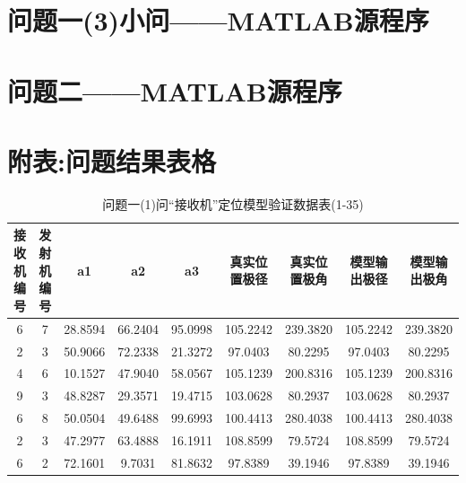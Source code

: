 \documentclass[withoutpreface,bwprint]{cumcmthesis} %
\begin{document}
\begin{appendices}
    	\section{问题一(3)小问——MATLAB源程序}
			
	     \section{问题二——MATLAB源程序}	
		\section{附表:问题结果表格}
					
					\begin{table}[htbp!]
						\caption{问题一(1)问“接收机”定位模型验证数据表(1-35)}
						\footnotesize
							\centering
							\begin{tabular}{@{}ccccccccc@{}}
								\toprule
								\textbf{接收机编号} & \textbf{发射机编号} & \textbf{a1} & \textbf{a2} & \textbf{a3} & \textbf{真实位置极径} & \textbf{真实位置极角} & \textbf{模型输出极径} & \textbf{模型输出极角} \\ \midrule
								6              & 7              & 28.8594     & 66.2404     & 95.0998     & 105.2242        & 239.3820        & 105.2242        & 239.3820        \\
								2              & 3              & 50.9066     & 72.2338     & 21.3272     & 97.0403         & 80.2295         & 97.0403         & 80.2295         \\
								4              & 6              & 10.1527     & 47.9040     & 58.0567     & 105.1239        & 200.8316        & 105.1239        & 200.8316        \\
								9              & 3              & 48.8287     & 29.3571     & 19.4715     & 103.0628        & 80.2937         & 103.0628        & 80.2937         \\
								6              & 8              & 50.0504     & 49.6488     & 99.6993     & 100.4413        & 280.4038        & 100.4413        & 280.4038        \\
								2              & 3              & 47.2977     & 63.4888     & 16.1911     & 108.8599        & 79.5724         & 108.8599        & 79.5724         \\
								6              & 2              & 72.1601     & 9.7031      & 81.8632     & 97.8389         & 39.1946         & 97.8389         & 39.1946         \\

\end{tabular}
\end{table}
\end{appendices}
\end{document}
